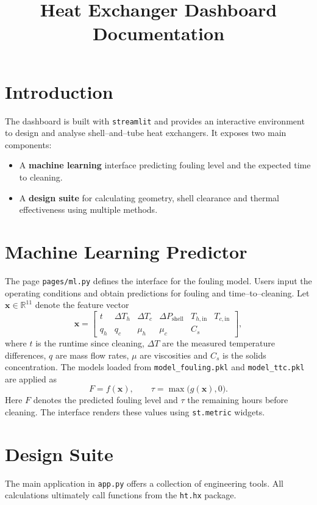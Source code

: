 \documentclass{article}
\title{Heat Exchanger Dashboard Documentation}
\author{}
\date{}
\begin{document}
\maketitle
\tableofcontents
\section{Introduction}
The dashboard is built with \texttt{streamlit} and provides an interactive environment to design and analyse shell--and--tube heat exchangers. It exposes two main components:
\begin{itemize}
  \item A \textbf{machine learning} interface predicting fouling level and the expected time to cleaning.
  \item A \textbf{design suite} for calculating geometry, shell clearance and thermal effectiveness using multiple methods.
\end{itemize}
\section{Machine Learning Predictor}
The page \texttt{pages/ml.py} defines the interface for the fouling model. Users input the operating conditions and obtain predictions for fouling and time--to--cleaning. Let $\mathbf{x} \in \mathbb{R}^{11}$ denote the feature vector
\begin{equation}
\mathbf{x}=\begin{bmatrix}
  t & \Delta T_h & \Delta T_c & \Delta P_{\text{shell}} & T_{h,\text{in}} & T_{c,\text{in}} \\ q_h & q_c & \mu_h & \mu_c & C_{s}
\end{bmatrix},
\end{equation}
where $t$ is the runtime since cleaning, $\Delta T$ are the measured temperature differences, $q$ are mass flow rates, $\mu$ are viscosities and $C_s$ is the solids concentration. The models loaded from \texttt{model\_fouling.pkl} and \texttt{model\_ttc.pkl} are applied as
\begin{equation}
F = f(\mathbf{x}), \qquad \tau = \max\bigl( g(\mathbf{x}),0 \bigr).
\end{equation}
Here $F$ denotes the predicted fouling level and $\tau$ the remaining hours before cleaning. The interface renders these values using \texttt{st.metric} widgets.
\section{Design Suite}
The main application in \texttt{app.py} offers a collection of engineering tools.  All calculations ultimately call functions from the \texttt{ht.hx} package.
\end{document}
